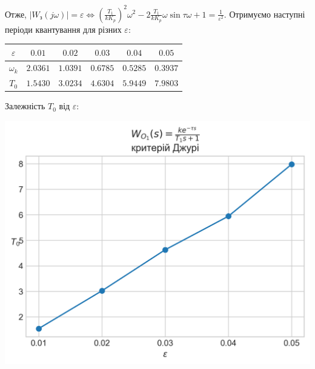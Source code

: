 Отже, $\left| W_{\text{з}}(j\omega) \right| = \varepsilon \Leftrightarrow \left(\frac{T_1}{k K_p}\right)^2 \omega^2 - 2\frac{T_1}{k K_p} \omega \sin \tau\omega + 1 = \frac{1}{\varepsilon^2}$.
Отримуємо наступні періоди квантування для різних $\varepsilon$:
\begin{center}
    \begin{tabular}{|c|c|c|c|c|c|}
        \hline
        $\varepsilon$ & $0.01$ & $0.02$ & $0.03$ & $0.04$ & $0.05$ \\
        \hline
        $\omega_k$ & $2.0361$ & $1.0391$ & $0.6785$ & $0.5285$ & $0.3937$ \\
        \hline
        $T_0$ & $1.5430$ & $3.0234$ & $4.6304$ & $5.9449$ & $7.9803$ \\
        \hline
    \end{tabular}
\end{center}
Залежність $T_0$ від $\varepsilon$:
\begin{center}
    \includegraphics[scale=0.85]{pics/W_01_Jury.png}
\end{center}


